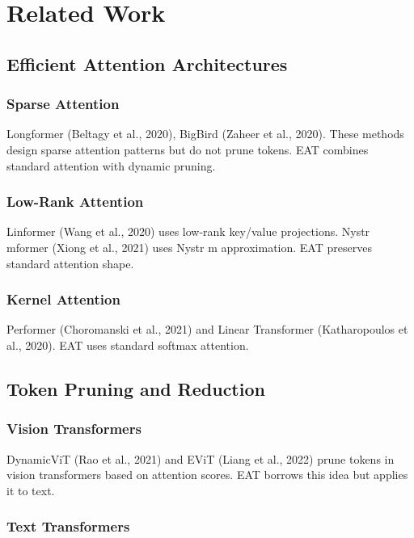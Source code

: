 
\section{Related Work}

\subsection{Efficient Attention Architectures}

\subsubsection{Sparse Attention}

Longformer (Beltagy et al., 2020), BigBird (Zaheer et al., 2020). These 
methods design sparse attention patterns but do not prune tokens. EAT 
combines standard attention with dynamic pruning.

\subsubsection{Low-Rank Attention}

Linformer (Wang et al., 2020) uses low-rank key/value projections. 
Nystr mformer (Xiong et al., 2021) uses Nystr m approximation. EAT 
preserves standard attention shape.

\subsubsection{Kernel Attention}

Performer (Choromanski et al., 2021) and Linear Transformer (Katharopoulos 
et al., 2020). EAT uses standard softmax attention.

\subsection{Token Pruning and Reduction}

\subsubsection{Vision Transformers}

DynamicViT (Rao et al., 2021) and EViT (Liang et al., 2022) prune tokens in 
vision transformers based on attention scores. EAT borrows this idea but 
applies it to text.

\subsubsection{Text Transformers}


